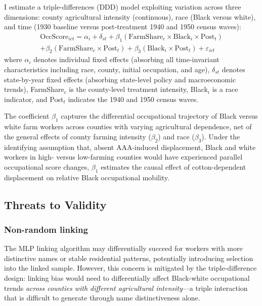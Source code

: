\documentclass[12pt]{article}
\begin{document}
I estimate a triple-differences (DDD) model exploiting variation across three dimensions: county agricultural intensity (continuous), race (Black versus white), and time (1930 baseline versus post-treatment 1940 and 1950 census waves):
\begin{multline}
\label{eq:ddd}
\text{OccScore}_{ict} = \alpha_i + \delta_{st} + \beta_1 (\text{FarmShare}_c \times \text{Black}_i \times \text{Post}_t) \\
+ \beta_2 (\text{FarmShare}_c \times \text{Post}_t) + \beta_3 (\text{Black}_i \times \text{Post}_t) + \varepsilon_{ict}
\end{multline}
where $\alpha_i$ denotes individual fixed effects (absorbing all time-invariant characteristics including race, county, initial occupation, and age), $\delta_{st}$ denotes state-by-year fixed effects (absorbing state-level policy and macroeconomic trends), FarmShare$_c$ is the county-level treatment intensity, Black$_i$ is a race indicator, and Post$_t$ indicates the 1940 and 1950 census waves.

The coefficient $\beta_1$ captures the differential occupational trajectory of Black versus white farm workers across counties with varying agricultural dependence, net of the general effects of county farming intensity ($\beta_2$) and race ($\beta_3$). Under the identifying assumption that, absent AAA-induced displacement, Black and white workers in high- versus low-farming counties would have experienced parallel occupational score changes, $\beta_1$ estimates the causal effect of cotton-dependent displacement on relative Black occupational mobility.

\subsection{Threats to Validity}

\subsubsection*{Non-random linking} The MLP linking algorithm may differentially succeed for workers with more distinctive names or stable residential patterns, potentially introducing selection into the linked sample. However, this concern is mitigated by the triple-difference design: linking bias would need to differentially affect Black-white occupational trends \textit{across counties with different agricultural intensity}---a triple interaction that is difficult to generate through name distinctiveness alone.
\end{document}
